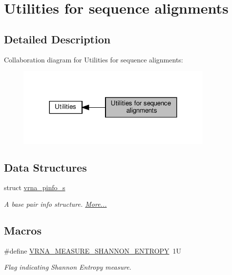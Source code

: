 \hypertarget{group__aln__utils}{}\section{Utilities for sequence alignments}
\label{group__aln__utils}


\subsection{Detailed Description}
Collaboration diagram for Utilities for sequence alignments\+:
\nopagebreak
\begin{figure}[H]
\begin{center}
\leavevmode
\includegraphics[width=275pt]{group__aln__utils}
\end{center}
\end{figure}
\subsection*{Data Structures}
\begin{DoxyCompactItemize}
\item 
struct \hyperlink{group__aln__utils_structvrna__pinfo__s}{vrna\+\_\+pinfo\+\_\+s}
\begin{DoxyCompactList}\small\item\em A base pair info structure.  \hyperlink{group__aln__utils_structvrna__pinfo__s}{More...}\end{DoxyCompactList}\end{DoxyCompactItemize}
\subsection*{Macros}
\begin{DoxyCompactItemize}
\item 
\#define \hyperlink{group__aln__utils_ga1e659227c9fc077d29989f576f129000}{V\+R\+N\+A\+\_\+\+M\+E\+A\+S\+U\+R\+E\+\_\+\+S\+H\+A\+N\+N\+O\+N\+\_\+\+E\+N\+T\+R\+O\+PY}~1U
\begin{DoxyCompactList}\small\item\em Flag indicating Shannon Entropy measure. \end{DoxyCompactList}\end{DoxyCompactItemize}
